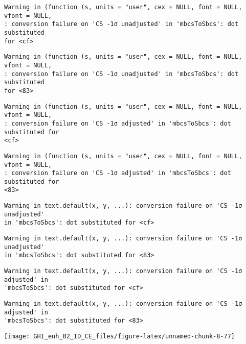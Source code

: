 \documentclass[
  10pt,
  a4paper,oneside]{article}
\begin{document}
\begin{verbatim}
Warning in (function (s, units = "user", cex = NULL, font = NULL, vfont = NULL,
: conversion failure on 'CS -1σ unadjusted' in 'mbcsToSbcs': dot substituted
for <cf>
\end{verbatim}

\begin{verbatim}
Warning in (function (s, units = "user", cex = NULL, font = NULL, vfont = NULL,
: conversion failure on 'CS -1σ unadjusted' in 'mbcsToSbcs': dot substituted
for <83>
\end{verbatim}

\begin{verbatim}
Warning in (function (s, units = "user", cex = NULL, font = NULL, vfont = NULL,
: conversion failure on 'CS -1σ adjusted' in 'mbcsToSbcs': dot substituted for
<cf>
\end{verbatim}

\begin{verbatim}
Warning in (function (s, units = "user", cex = NULL, font = NULL, vfont = NULL,
: conversion failure on 'CS -1σ adjusted' in 'mbcsToSbcs': dot substituted for
<83>
\end{verbatim}

\begin{verbatim}
Warning in text.default(x, y, ...): conversion failure on 'CS -1σ unadjusted'
in 'mbcsToSbcs': dot substituted for <cf>
\end{verbatim}

\begin{verbatim}
Warning in text.default(x, y, ...): conversion failure on 'CS -1σ unadjusted'
in 'mbcsToSbcs': dot substituted for <83>
\end{verbatim}

\begin{verbatim}
Warning in text.default(x, y, ...): conversion failure on 'CS -1σ adjusted' in
'mbcsToSbcs': dot substituted for <cf>
\end{verbatim}

\begin{verbatim}
Warning in text.default(x, y, ...): conversion failure on 'CS -1σ adjusted' in
'mbcsToSbcs': dot substituted for <83>
\end{verbatim}

\begin{center}\texttt{[image: GHI\_enh\_02\_ID\_CE\_files/figure-latex/unnamed-chunk-8-77]} \end{center}
\end{document}
